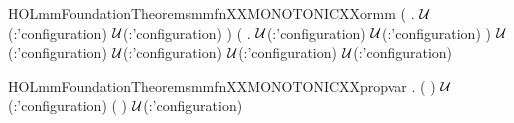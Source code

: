 \begin{SaveVerbatim}{HOLmmFoundationTheoremsmmfnXXMONOTONICXXormm}
\HOLTokenTurnstile{} (\HOLSymConst{\HOLTokenForall{}} .
         \HOLSymConst{\HOLTokenImp{}}
         \ensuremath{\cal{U}}(:'configuration)  \HOLConst{\HOLTokenSubset{}}
         \ensuremath{\cal{U}}(:'configuration) ) \HOLSymConst{\HOLTokenImp{}}
   (\HOLSymConst{\HOLTokenForall{}} .
         \HOLSymConst{\HOLTokenImp{}}
         \ensuremath{\cal{U}}(:'configuration)  \HOLConst{\HOLTokenSubset{}}
         \ensuremath{\cal{U}}(:'configuration) ) \HOLSymConst{\HOLTokenImp{}}
      \HOLSymConst{\HOLTokenImp{}}
      \ensuremath{\cal{U}}(:'configuration)  \HOLConst{\HOLTokenUnion{}}
      \ensuremath{\cal{U}}(:'configuration)  \HOLConst{\HOLTokenSubset{}}
      \ensuremath{\cal{U}}(:'configuration)  \HOLConst{\HOLTokenUnion{}}
      \ensuremath{\cal{U}}(:'configuration) 
\end{SaveVerbatim}
\newcommand{\HOLmmFoundationTheoremsmmfnXXMONOTONICXXormm}{\UseVerbatim{HOLmmFoundationTheoremsmmfnXXMONOTONICXXormm}}
\begin{SaveVerbatim}{HOLmmFoundationTheoremsmmfnXXMONOTONICXXpropvar}
\HOLTokenTurnstile{} \HOLSymConst{\HOLTokenForall{}}  .
        \HOLSymConst{\HOLTokenImp{}}
       ( ) \ensuremath{\cal{U}}(:'configuration)  \HOLConst{\HOLTokenSubset{}}
       ( ) \ensuremath{\cal{U}}(:'configuration) 
\end{SaveVerbatim}
